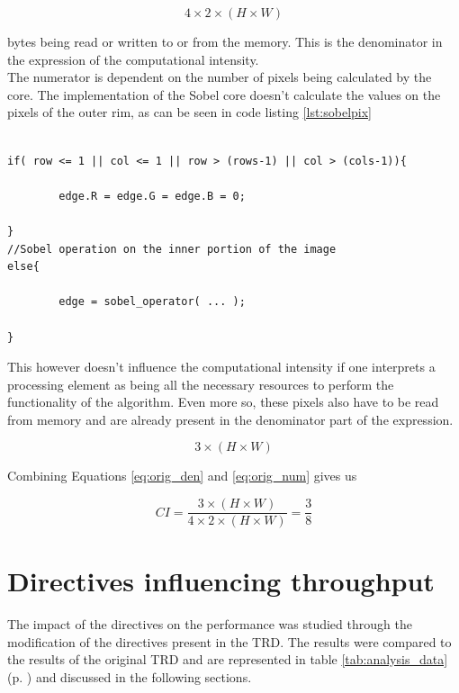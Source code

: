\begin{equation} \label{eq:orig_den}
4 \times 2 \times ( H \times W )
\end{equation}

bytes being read or written to or from the memory. This is the denominator in the expression of the computational intensity.\\
The numerator is dependent on the number of pixels being calculated by the core. The implementation of the Sobel core doesn't calculate the values on the pixels of the outer rim, as can be seen in code listing \ref{lst:sobelpix}

\begin{lstlisting}[caption=Sobel Code Snippet, captionpos=b, label=lst:sobelpix]

if( row <= 1 || col <= 1 || row > (rows-1) || col > (cols-1)){
		
		edge.R = edge.G = edge.B = 0;
		
}
//Sobel operation on the inner portion of the image
else{

		edge = sobel_operator( ... );
		
}

\end{lstlisting}

This however doesn't influence the computational intensity if one interprets a processing element as being all the necessary resources to perform the functionality of the algorithm. Even more so, these pixels also have to be read from memory and are already present in the denominator part of the expression.


\begin{equation} \label{eq:orig_num}
3 \times ( H \times W )
\end{equation}

\medskip
Combining Equations \ref{eq:orig_den} and \ref{eq:orig_num} gives us
\medskip

\begin{equation}
CI = \frac{3 \times (H \times W)}{4 \times 2 \times ( H \times W )} = \frac{3}{8}
\end{equation}




\section{Directives influencing throughput}

The impact of the directives on the performance was studied through the modification of the directives present in the TRD. The results were compared to the results of the original TRD and are represented in table \ref{tab:analysis_data} (p. \pageref{tab:analysis_data}) and discussed in the following sections.

